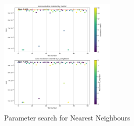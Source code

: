 \documentclass{article}
\begin{document}
    \begin{figure}
        \centering
        \includegraphics[width=0.5\textwidth]{report_img/param_search/nearest_neighbors}
        \caption{Parameter search for Nearest Neighbours}
        \label{fig:}
    \end{figure}
\end{document}
